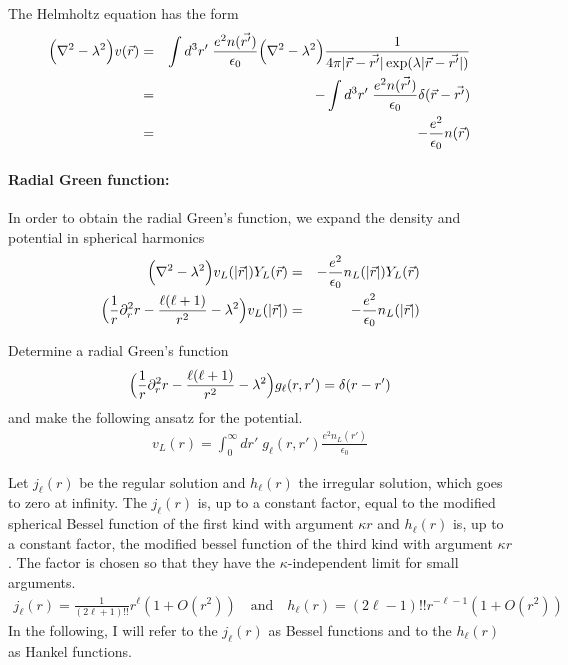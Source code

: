 \documentclass[11pt,a4paper]{report}
\begin{document}
The Helmholtz equation has the form
\begin{eqnarray}
\Bigl(\nabla^2 -\lambda^2\Bigr)v(\vec{r})&=&
\int d^3r'\; 
\frac{e^2 n(\vec{r'})}{\epsilon_0}
\Bigl(\nabla^2 -\lambda^2\Bigr)
\frac{1}{4\pi|\vec{r}-\vec{r'}|\exp(\lambda|\vec{r}-\vec{r'}|)}
\nonumber\\
%
&=&-\int d^3r'\; 
\frac{e^2 n(\vec{r'})}{\epsilon_0}
\delta(\vec{r}-\vec{r'})
\nonumber\\
&=&-\frac{e^2 }{\epsilon_0}n(\vec{r})
\end{eqnarray}

\paragraph{Radial Green function:}
In order to obtain the radial Green's function, we expand the density
and potential in spherical harmonics
\begin{eqnarray}
\Bigl(\nabla^2 -\lambda^2\Bigr)v_L(|\vec{r}|)Y_L(\vec{r})
&=&-\frac{e^2}{\epsilon_0}n_L(|\vec{r}|)Y_L(\vec{r})
\nonumber\\
\Bigl(\frac{1}{r}\partial^2_r r-\frac{\ell(\ell+1)}{r^2}-\lambda^2\Bigr)
v_L(|\vec{r}|)&=&-\frac{e^2}{\epsilon_0}n_L(|\vec{r}|)
\nonumber\\
\end{eqnarray}

Determine a radial Green's function
\begin{eqnarray}
\Bigl(\frac{1}{r}\partial_r^2 r-\frac{\ell(\ell+1)}{r^2}-\lambda^2\Bigr)
g_{\ell}(r,r')=\delta(r-r')
\end{eqnarray}
and make the following ansatz for the potential.
\begin{eqnarray}
v_L(r)=\int_0^\infty dr'\; g_\ell(r,r')\frac{e^2n_L(r')}{\epsilon_0}
\end{eqnarray}

Let $j_\ell(r)$ be the regular solution and $h_\ell(r)$ the irregular
solution, which goes to zero at infinity. The $j_\ell(r)$ is, up to a
constant factor, equal to the modified spherical Bessel function of
the first kind with argument $\kappa r$ and $h_\ell(r)$ is, up to a
constant factor, the modified bessel function of the third kind with
argument $\kappa r$.  The factor is chosen so that they have the
$\kappa$-independent limit for small arguments.
\begin{eqnarray}
j_\ell(r)=\frac{1}{(2\ell+1)!!}r^\ell(1+O(r^2))
\quad\text{and}\quad
h_\ell(r)=(2\ell-1)!!r^{-\ell-1}(1+O(r^2))
\end{eqnarray}
In the following, I will refer to the $j_\ell(r)$ as Bessel functions
and to the $h_\ell(r)$ as Hankel functions.
\end{document}
